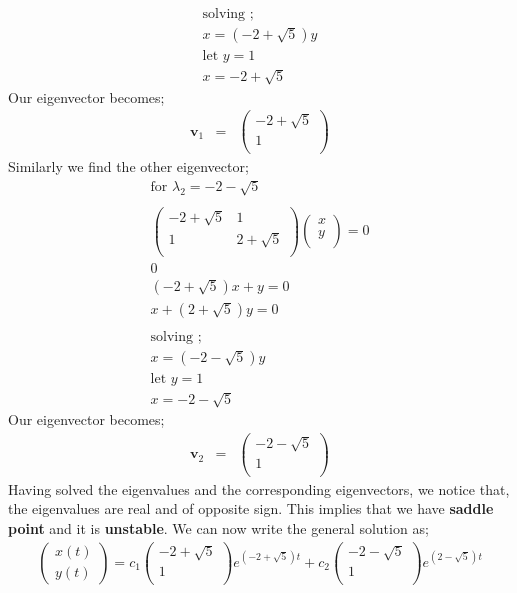 \documentclass[12pt,a4paper]{article}
\begin{document}
\begin{enumerate}
\begin{eqnarray*}
\text{solving ;}\\
x=(-2+\sqrt{5})y\\
\text{let } y=1\\
x=-2+\sqrt{5}
\end{eqnarray*}
Our eigenvector becomes;
\begin{eqnarray*}
\textbf{v}_1 &=&\begin{pmatrix} 
 -2+\sqrt{5}\\
1\\
\end{pmatrix}
\end{eqnarray*}
Similarly we find the other eigenvector;
\begin{eqnarray*}
\text{for $\lambda_2=-2-\sqrt{5}$}\\ \\
\begin{pmatrix} 
-2+\sqrt{5} & 1 \\
1 & 2+\sqrt{5}\\
\end{pmatrix}
\begin{pmatrix} 
 x \\
y\\
\end{pmatrix}=
 0 \\
0\\
(-2+\sqrt{5})x +y=0\\
x+(2+\sqrt{5})y =0\\ \\
\text{solving ;}\\
x=(-2-\sqrt{5})y\\
\text{let } y=1\\
x=-2-\sqrt{5}
\end{eqnarray*}
Our eigenvector becomes;
\begin{eqnarray*}
\textbf{v}_2 &=&\begin{pmatrix} 
 -2-\sqrt{5}\\
1\\
\end{pmatrix}
\end{eqnarray*}
Having solved the eigenvalues and the corresponding eigenvectors, we notice that, the eigenvalues are real and of opposite sign. This implies that we have \textbf{saddle point} and it is \textbf{unstable}.
We can now write the general solution as;
\begin{eqnarray*}
\begin{pmatrix}
x(t) \\
y(t)
\end{pmatrix}=c_1 
 \begin{pmatrix} 
 -2+\sqrt{5}\\
1\\

\end{pmatrix}e^{(-2+\sqrt{5})t}+c_2 \begin{pmatrix} 
 -2-\sqrt{5}\\
1\\
\end{pmatrix}e^{(2-\sqrt{5})t}\\
\end{eqnarray*}
\end{enumerate}
\end{document}
